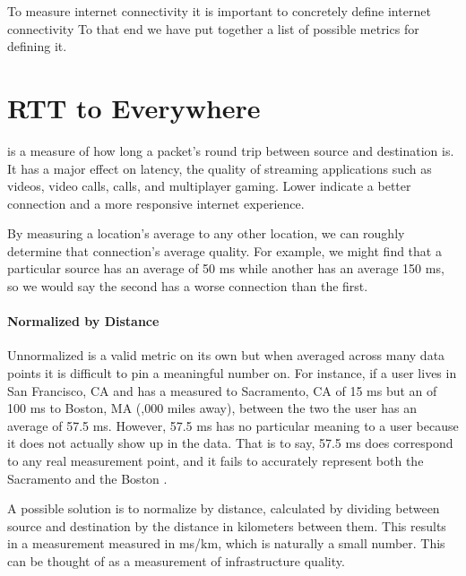 To measure internet connectivity it is important to concretely define internet connectivity To that end we have put together a list of possible metrics for defining it.

\section{RTT to Everywhere}
\label{sec:definition_rtt_to_everywhere}

\RTT is a measure of how long a packet's round trip between source and destination is. It has a major effect on latency, the quality of streaming applications such as videos, video calls, \voip calls, and multiplayer gaming. Lower \rtts indicate a better connection and a more responsive internet experience.

By measuring a location's average \rtt to any other location, we can roughly determine that connection's average quality. For example, we might find that a particular source has an average \rtt of 50 ms while another has an average 150 ms, so we would say the second has a worse connection than the first.

\paragraph{Normalized by Distance}
Unnormalized \rtt is a valid metric on its own but when averaged across many data points it is difficult to pin a meaningful number on. For instance, if a user lives in San Francisco, CA and has a measured \rtt to Sacramento, CA of 15 ms but an \rtt of 100 ms to Boston, MA (,000 miles away), between the two the user has an average \rtt of 57.5 ms. However, 57.5 ms has no particular meaning to a user because it does not actually show up in the data. That is to say, 57.5 ms does correspond to any real measurement point, and it fails to accurately represent both the Sacramento \rtt and the Boston \rtt.

A possible solution is to normalize \rtts by distance, calculated by dividing \rtt between source and destination by the distance in kilometers between them. This results in a measurement measured in ms/km, which is naturally a small number. This can be thought of as a measurement of infrastructure quality.

